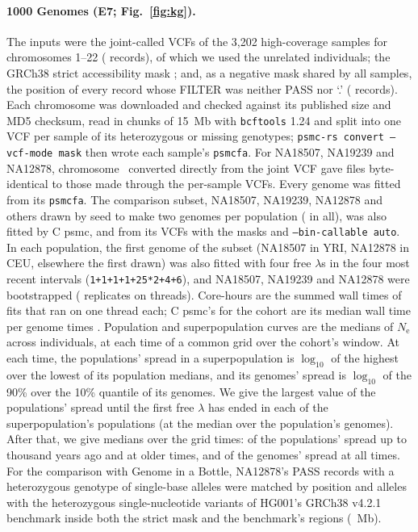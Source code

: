 \documentclass[11pt]{article}
\newcommand{\Ne}{\ensuremath{N_\mathrm{e}}}
\newcommand{\opt}[1]{\texttt{#1}}
\begin{document}
\paragraph{1000 Genomes (E7; Fig.~\ref{fig:kg}).} The inputs were the joint-called VCFs of the 3,202 high-coverage samples \citep{byrskabishop2022} for chromosomes 1--22 (\EsevenRecords{} records), of which we used the \EsevenGenomes{} unrelated individuals; the GRCh38 strict accessibility mask \citep{kgp2015}; and, as a negative mask shared by all samples, the position of every record whose FILTER was neither PASS nor `.' (\EsevenNonpass{} records). Each chromosome was downloaded and checked against its published size and MD5 checksum, read in chunks of 15~Mb with \texttt{bcftools} 1.24 \citep{danecek2021} and split into one VCF per sample of its heterozygous or missing genotypes; \opt{psmc-rs convert --vcf-mode mask} then wrote each sample's \texttt{psmcfa}. For NA18507, NA19239 and NA12878, chromosome~\EsevenPilotChrom{} converted directly from the joint VCF gave files byte-identical to those made through the per-sample VCFs. Every genome was fitted from its \texttt{psmcfa}. The comparison subset, NA18507, NA19239, NA12878 and others drawn by seed to make two genomes per population (\EsevenDefault{} in all), was also fitted by C psmc, and from its VCFs with the masks and \opt{--bin-callable auto}. In each population, the first genome of the subset (NA18507 in YRI, NA12878 in CEU, elsewhere the first drawn) was also fitted with four free $\lambda$s in the four most recent intervals (\opt{1+1+1+1+25*2+4+6}), and NA18507, NA19239 and NA12878 were bootstrapped (\EsevenBootReps{} replicates on \EsevenBootThreads{} threads). Core-hours are the summed wall times of fits that ran on one thread each; C psmc's for the cohort are its median wall time per genome times \EsevenGenomes{}. Population and superpopulation curves are the medians of $\Ne$ across individuals, at each time of a common grid over the cohort's window. At each time, the populations' spread in a superpopulation is $\log_{10}$ of the highest over the lowest of its population medians, and its genomes' spread is $\log_{10}$ of the 90\% over the 10\% quantile of its genomes. We give the largest value of the populations' spread until the first free $\lambda$ has ended in each of the superpopulation's populations (at the median over the population's genomes). After that, we give medians over the grid times: of the populations' spread up to \EsevenPopCutKy{} thousand years ago and at older times, and of the genomes' spread at all times. For the comparison with Genome in a Bottle, NA12878's PASS records with a heterozygous genotype of single-base alleles were matched by position and alleles with the heterozygous single-nucleotide variants of HG001's GRCh38 v4.2.1 benchmark \citep{wagner2022} inside both the strict mask and the benchmark's regions (\EsevenGiabMb{}~Mb).
\end{document}
